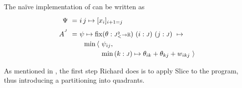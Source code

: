 \exampleTitle

\noindent
The na\"ive implementation of 
can be written as
%
\newcommand\Jsquaredltsml{J^2_{\mbox{\fontsize{6}{6}\selectfont \hspace{.5pt}<}}}
\begin{equation}
  \renewcommand\arraystretch{1.2}
  \begin{array}{@{}r@{}l@{}}
    \Psi ~=~ & i\,j\mapsto
	           [x_i]_{i+1=j} \\[2mm]
%
    A^{^{J}} ~=~ 
	      & \psi\mapsto \fix 
	        \htyped{\theta}{\Jsquaredltsml\to\R}~ \htyped{i}{J} ~ \htyped{j}{J}
	        ~\mapsto \\
	      &
          ~~
	      \begin{array}{@{}l@{}l@{}} 
	        \min\,\langle~ & \psi_{ij}, \\
	         & \min\, \htyped k J \mapsto\theta_{ik}+\theta_{kj}+w_{ikj}
	        ~\rangle
	      \end{array}
  \end{array}
  \label{tactics:paren phase A}
\end{equation}


As mentioned in , the first step Richard does is to apply
{\sf Slice} to the program, thus introducing a partitioning into quadrants.

\smallskip

